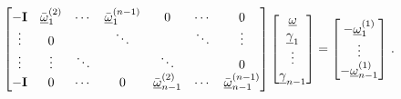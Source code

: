 \begin{equation}\label{eq:cloud_fusion:secfci_nsen_omega_solution}
    \begin{bmatrix}
        -{{\mathbf{I}}} & \bar{{\underline{\omega}}}_1^{(2)} & \cdots & \bar{{\underline{\omega}}}_1^{(n-1)} & 0 & \cdots & 0\\
        \vdots & 0 &  & \ddots &  & \ddots & \vdots\\
        \vdots & \vdots & \ddots &  & \ddots &  & 0\\
        -{{\mathbf{I}}} & 0 & \cdots & 0 & \bar{{\underline{\omega}}}_{n-1}^{(2)} & \cdots & \bar{{\underline{\omega}}}_{n-1}^{(n-1)}
    \end{bmatrix}
    \begin{bmatrix}
        {\underline{\omega}}\\
        {\underline{\gamma}}_1\\
        \vdots\\
        {\underline{\gamma}}_{n-1}\\
    \end{bmatrix}=
    \begin{bmatrix}
        -{\underline{\omega}}_1^{(1)}\\
        \vdots\\
        -{\underline{\omega}}_{n-1}^{(1)}\\
    \end{bmatrix}\,.
\end{equation}

